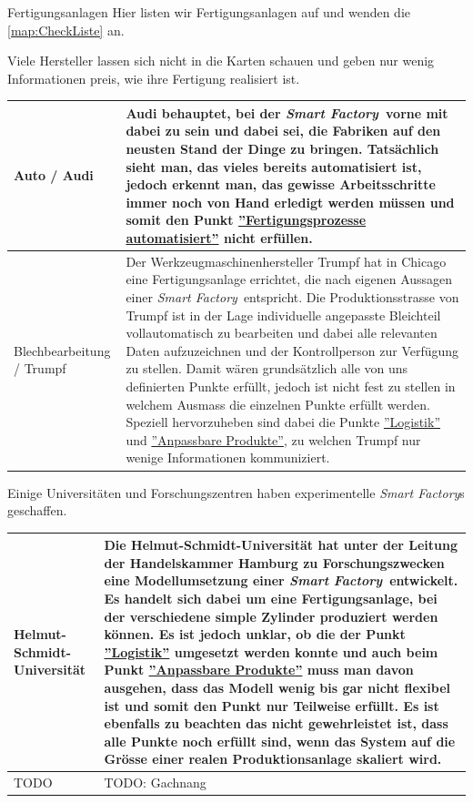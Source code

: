 \documentclass{article}
\def\SmartFactory{\textcolor{DarkestGray}{\textit{Smart Factory}}}
\begin{document}
\begin{Map}{Fertigungsanlagen}\label{map:Fertigungsanlagen}
Hier listen wir Fertigungsanlagen auf und wenden die \ref{map:CheckListe} an.

Viele Hersteller lassen sich nicht in die Karten schauen und geben nur wenig Informationen preis, wie ihre Fertigung realisiert ist. 
\par\medskip
\begin{tabular}{p{3.2cm}p{8cm}}\toprule
  Auto / Audi & Audi behauptet, bei der \SmartFactory\ vorne mit dabei zu sein und dabei sei, die Fabriken auf den neusten Stand der Dinge zu bringen. Tatsächlich sieht man, das vieles bereits automatisiert ist, jedoch erkennt man, das gewisse Arbeitsschritte immer noch von Hand erledigt werden müssen und somit den Punkt \hyperlink{CheckListe:Fertigungsprozess}{''Fertigungsprozesse automatisiert''} nicht erfüllen.\cite{Audi}\cite{AudiKommentarlos}\\\midrule
  Blechbearbeitung / Trumpf & Der Werkzeugmaschinenhersteller Trumpf hat in Chicago eine Fertigungsanlage errichtet, die nach eigenen Aussagen einer \SmartFactory\ entspricht. Die Produktionsstrasse von Trumpf ist in der Lage individuelle angepasste Bleichteil vollautomatisch zu bearbeiten und dabei alle relevanten Daten aufzuzeichnen und der Kontrollperson zur Verfügung zu stellen. Damit wären grundsätzlich alle von uns definierten Punkte erfüllt, jedoch ist nicht fest zu stellen in welchem Ausmass die einzelnen Punkte erfüllt werden. Speziell hervorzuheben sind dabei die Punkte \hyperlink{CheckListe:Fertigungsprozess}{''Logistik''} und \hyperlink{CheckListe:Fertigungsprozess}{''Anpassbare Produkte''}, zu welchen Trumpf nur wenige Informationen kommuniziert.\\\bottomrule
\end{tabular}

Einige Universitäten und Forschungszentren haben experimentelle \SmartFactory s geschaffen.
\par\medskip
\begin{tabular}{p{3.2cm}p{8cm}}\toprule
  Helmut-Schmidt-Universität & Die Helmut-Schmidt-Universität hat unter der Leitung der Handelskammer Hamburg zu Forschungszwecken eine Modellumsetzung einer \SmartFactory\ entwickelt. Es handelt sich dabei um eine Fertigungsanlage, bei der verschiedene simple Zylinder produziert werden können. Es ist jedoch unklar, ob die der Punkt  \hyperlink{CheckListe:Fertigungsprozess}{''Logistik''} umgesetzt werden konnte und auch beim Punkt \hyperlink{CheckListe:Fertigungsprozess}{''Anpassbare Produkte''} muss man davon ausgehen, dass das Modell wenig bis gar nicht flexibel ist und somit den Punkt nur Teilweise erfüllt. Es ist ebenfalls zu beachten das nicht gewehrleistet ist, dass alle Punkte noch erfüllt sind, wenn das System auf die Grösse einer realen Produktionsanlage skaliert wird.\\\midrule
  TODO & TODO: Gachnang\\\bottomrule
\end{tabular}


\end{Map}
\end{document}
